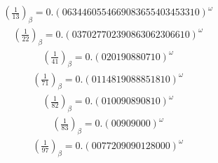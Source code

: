 \documentclass[fleqn]{article}
\begin{document}
\begin{equation*}
\begin{split}
(\frac{1}{13})_\beta = 0.(0634460554669083655403453310)^\omega
\end{split}\end{equation*}
\begin{equation*}
\begin{split}
(\frac{1}{22})_\beta = 0.(037027702390863062306610)^\omega
\end{split}\end{equation*}
\begin{equation*}
\begin{split}
(\frac{1}{41})_\beta = 0.(020190880710)^\omega
\end{split}\end{equation*}
\begin{equation*}
\begin{split}
(\frac{1}{71})_\beta = 0.(0114819088851810)^\omega
\end{split}\end{equation*}
\begin{equation*}
\begin{split}
(\frac{1}{82})_\beta = 0.(010090890810)^\omega
\end{split}\end{equation*}
\begin{equation*}
\begin{split}
(\frac{1}{83})_\beta = 0.(00909000)^\omega
\end{split}\end{equation*}
\begin{equation*}
\begin{split}
(\frac{1}{97})_\beta = 0.(0077209090128000)^\omega
\end{split}\end{equation*}
\end{document}
